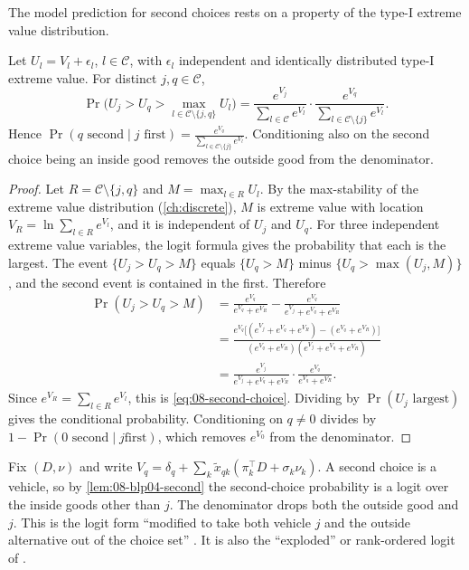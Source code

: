 The model prediction for second choices rests on a property of the type-I extreme value distribution.

\begin{lemma}\label{lem:08-blp04-second}
Let $U_l = V_l + \epsilon_l$, $l \in \mathcal{C}$, with $\epsilon_l$ independent and identically distributed type-I
extreme value. For distinct $j, q \in \mathcal{C}$,
\begin{equation}\label{eq:08-second-choice}
  \Pr\Big(U_j > U_q > \max_{l \in \mathcal{C}\setminus\{j,q\}} U_l\Big)
  = \frac{e^{V_j}}{\sum_{l\in\mathcal{C}} e^{V_l}} \cdot \frac{e^{V_q}}{\sum_{l\in\mathcal{C}\setminus\{j\}} e^{V_l}} .
\end{equation}
Hence $\Pr(q \text{ second} \mid j \text{ first}) = \frac{e^{V_q}}{\sum_{l \in \mathcal{C}\setminus\{j\}} e^{V_l}}$.
Conditioning also on the second choice being an inside good removes the outside good from the denominator.
\end{lemma}

\begin{proof}
Let $R = \mathcal{C}\setminus\{j,q\}$ and $M = \max_{l\in R}U_l$. By the max-stability of the extreme value
distribution (\cref{ch:discrete}), $M$ is extreme value with location $V_R = \ln\sum_{l\in R}e^{V_l}$, and it is
independent of $U_j$ and $U_q$. For three independent extreme value variables, the logit formula gives the probability
that each is the largest. The event $\{U_j > U_q > M\}$ equals $\{U_q > M\}$ minus $\{U_q > \max(U_j, M)\}$, and the
second event is contained in the first. Therefore
\begin{align*}
  \Pr(U_j > U_q > M) &= \frac{e^{V_q}}{e^{V_q} + e^{V_R}} - \frac{e^{V_q}}{e^{V_j} + e^{V_q} + e^{V_R}}\\
  &= \frac{e^{V_q}\big[(e^{V_j} + e^{V_q} + e^{V_R}) - (e^{V_q} + e^{V_R})\big]}
  {(e^{V_q} + e^{V_R})(e^{V_j} + e^{V_q} + e^{V_R})}\\
  &= \frac{e^{V_j}}{e^{V_j} + e^{V_q} + e^{V_R}}\cdot\frac{e^{V_q}}{e^{V_q} + e^{V_R}} .
\end{align*}
Since $e^{V_R} = \sum_{l\in R}e^{V_l}$, this is \eqref{eq:08-second-choice}. Dividing by $\Pr(U_j \text{ largest})$
gives the conditional probability. Conditioning on $q \neq 0$ divides by $1 - \Pr(0 \text{ second} \mid j \text{
first})$, which removes $e^{V_0}$ from the denominator.
\end{proof}

Fix $(D, \nu)$ and write $V_{q} = \delta_q + \sum_k \tilde x_{qk}(\pi_k^\top D + \sigma_k\nu_k)$. A second choice is a
vehicle, so by \cref{lem:08-blp04-second} the second-choice probability is a logit over the inside goods other than
$j$. The denominator drops both the outside good and $j$. This is the logit form ``modified to take both vehicle $j$
and the outside alternative out of the choice set'' \citep[p.~79]{BerryLevinsohnPakes2004}. It is also the
``exploded'' or rank-ordered logit of \citet{BeggsCardellHausman1981}.

